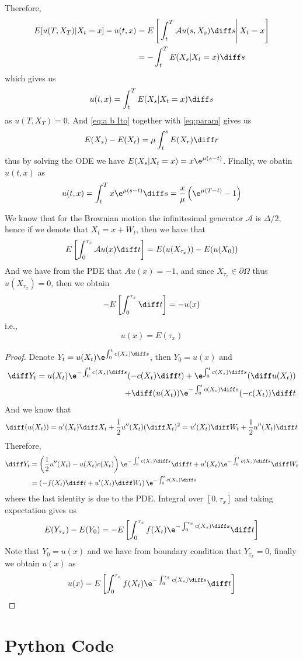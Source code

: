 Therefore,
\[\begin{aligned}
    E[u(T,X_T)|X_t=x]-u(t,x)
    &=E\left[\left.\int_t^T\mathcal Au(s,X_s)\diff s\right|
    X_t=x\right]\\
    &=-\int_t^TE(X_s|X_t=x)\diff s
\end{aligned}\]
which gives us
\[u(t,x)=\int_t^TE(X_s|X_t=x)\diff s\]
as $u(T,X_T)=0$.
And \cref{eq:a b Ito} together with \cref{eq:param} gives us
\[E(X_s)-E(X_t)=\mu\int_t^sE(X_r)\diff r\]
thus by solving the ODE we have $E(X_s|X_t=x)=x\e^{\mu(s-t)}$.
Finally, we obatin $u(t,x)$ as
\[u(t,x)=\int_t^Tx\e^{\mu(s-t)}\diff s
=\frac{x}{\mu}\left(\e^{\mu(T-t)}-1\right)\]

\problem
We know that for the Brownian motion the infinitesimal generator
$\mathcal A$ is $\Delta/2$, hence if we denote that $X_t=x+W_t$, then
we have that
\[E\left[\int_0^{\tau_x}\mathcal Au(x)\diff t\right]
=E(u(X_{\tau_x}))-E(u(X_0))\]
And we have from the PDE that $Au(x)=-1$,
and since $X_{\tau_x}\in\partial\Omega$ thus $u(X_{\tau_x})=0$,
then we obtain
\[-E\left[\int_0^{\tau_x}\diff t\right]=-u(x)\]
i.e.,
\[u(x)=E(\tau_x)\]

\problem
\begin{proof}
    Denote $Y_t=u(X_t)\e^{\int_0^tc(X_s)\diff s}$,
    then $Y_0=u(x)$ and
    \[\diff Y_t=
    \begin{aligned}[t]
    u(X_t)\e^{-\int_0^tc(X_s)\diff s}(-c(X_t)\diff t)
    +\e^{\int_0^tc(X_s)\diff s}(\diff u(X_t))\\
    +\diff(u(X_t))\e^{-\int_0^tc(X_s)\diff s}(-c(X_t))\diff t
    \end{aligned}\]
    And we know that
    \[\diff(u(X_t))=u'(X_t)\diff X_t+\frac{1}{2}u''(X_t)(\diff X_t)^2
    =u'(X_t)\diff W_t+\frac{1}{2}u''(X_t)\diff t\]
    Therefore,
    \[\begin{aligned}
        \diff Y_t&=
        \left(\frac{1}{2}u''(X_t)-u(X_t)c(X_t)\right)\e^{-\int_0^tc(X_s)\diff s}\diff t
        +u'(X_t)\e^{-\int_0^tc(X_s)\diff s}\diff W_t\\
        &=\left(-f(X_t)\diff t+u'(X_t)\diff W_t\right)\e^{-\int_0^tc(X_s)\diff s}
    \end{aligned}\]
    where the last identity is due to the PDE.
    Integral over $[0,\tau_x]$ and taking expectation gives us
    \[E(Y_{\tau_x})-E(Y_0)
    =-E\left[\int_0^{\tau_x}f(X_t)\e^{-\int_0^{\tau_x}c(X_s)\diff s}\diff t\right]\]
    Note that $Y_0=u(x)$ and we have from boundary condition that $Y_{\tau_x}=0$,
    finally we obtain $u(x)$ as
    \[u(x)=E\left[\int_0^{\tau_x}f(X_t)\e^{-\int_0^{\tau_x}c(X_s)\diff s}\diff t\right]\]
\end{proof}

\appendix
\section{Python Code}
